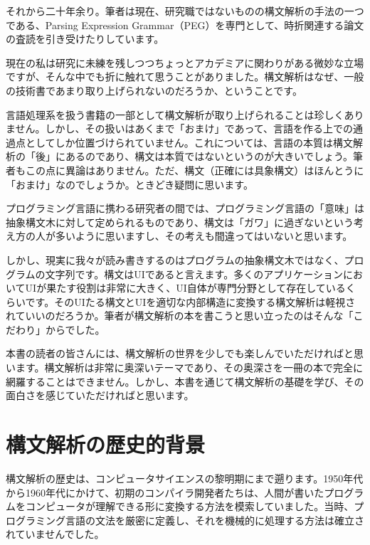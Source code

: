 それから二十年余り。筆者は現在、研究職ではないものの構文解析の手法の一つである、Parsing
Expression
Grammar（PEG）を専門として、時折関連する論文の査読を引き受けたりしています。

現在の私は研究に未練を残しつつちょっとアカデミアに関わりがある微妙な立場ですが、そんな中でも折に触れて思うことがありました。構文解析はなぜ、一般の技術書であまり取り上げられないのだろうか、ということです。

言語処理系を扱う書籍の一部として構文解析が取り上げられることは珍しくありません。しかし、その扱いはあくまで「おまけ」であって、言語を作る上での通過点としてしか位置づけられていません。これについては、言語の本質は構文解析の「後」にあるのであり、構文は本質ではないというのが大きいでしょう。筆者もこの点に異論はありません。ただ、構文（正確には具象構文）はほんとうに「おまけ」なのでしょうか。ときどき疑問に思います。

プログラミング言語に携わる研究者の間では、プログラミング言語の「意味」は抽象構文木に対して定められるものであり、構文は「ガワ」に過ぎないという考え方の人が多いように思いますし、その考えも間違ってはいないと思います。

しかし、現実に我々が読み書きするのはプログラムの抽象構文木ではなく、プログラムの文字列です。構文はUIであると言えます。多くのアプリケーションにおいてUIが果たす役割は非常に大きく、UI自体が専門分野として存在しているくらいです。そのUIたる構文とUIを適切な内部構造に変換する構文解析は軽視されていいのだろうか。筆者が構文解析の本を書こうと思い立ったのはそんな「こだわり」からでした。

本書の読者の皆さんには、構文解析の世界を少しでも楽しんでいただければと思います。構文解析は非常に奥深いテーマであり、その奥深さを一冊の本で完全に網羅することはできません。しかし、本書を通じて構文解析の基礎を学び、その面白さを感じていただければと思います。

\hypertarget{chapter1-ux69cbux6587ux89e3ux6790ux306eux6b74ux53f2ux7684ux80ccux666f}{%
\section{構文解析の歴史的背景}\label{chapter1-ux69cbux6587ux89e3ux6790ux306eux6b74ux53f2ux7684ux80ccux666f}}

構文解析の歴史は、コンピュータサイエンスの黎明期にまで遡ります。1950年代から1960年代にかけて、初期のコンパイラ開発者たちは、人間が書いたプログラムをコンピュータが理解できる形に変換する方法を模索していました。当時、プログラミング言語の文法を厳密に定義し、それを機械的に処理する方法は確立されていませんでした。

